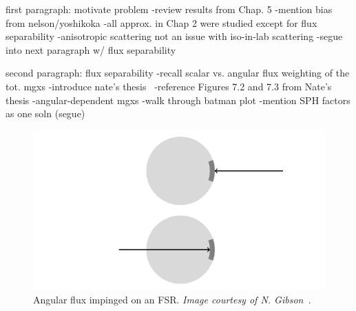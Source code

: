 first paragraph: motivate problem
-review results from Chap. 5
-mention bias from nelson/yoshikoka 
-all approx. in Chap 2 were studied except for flux separability
-anisotropic scattering not an issue with iso-in-lab scattering
-segue into next paragraph w/ flux separability

second paragraph: flux separability
-recall scalar vs. angular flux weighting of the tot. mgxs
-introduce nate's thesis~\cite{gibson2016thesis}
  -reference Figures 7.2 and 7.3 from Nate's thesis
-angular-dependent mgxs
-walk through batman plot
-mention SPH factors as one soln (segue)


\begin{figure}[H]
  \centering
  \includegraphics[width=\linewidth]{figures/sph/incoming-outgoing}
  \caption{}
\caption[Angular flux impinged on an FSR]{Angular flux impinged on an FSR. \textit{Image courtesy of N. Gibson~\cite{gibson2016thesis}.}}
\label{fig:chap6-incoming-outgoing}
\end{figure}

